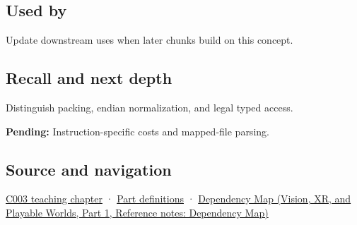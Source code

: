 \subsection{Used by}\label{appendix-0682dbfc5f0e-used-by}

\hypertarget{appendix-0682dbfc5f0e-used-by}{}

Update downstream uses when later chunks build on this concept.

\subsection{Recall and next depth}\label{appendix-0682dbfc5f0e-recall-and-next-depth}

\hypertarget{appendix-0682dbfc5f0e-recall-and-next-depth}{}

Distinguish packing, endian normalization, and legal typed access.

\textbf{Pending:} Instruction-specific costs and mapped-file parsing.

\subsection{Source and navigation}\label{appendix-0682dbfc5f0e-source-and-navigation}

\hypertarget{appendix-0682dbfc5f0e-source-and-navigation}{}

\hyperref[01-foundations-i-ch002-where-the-bytes-live]{C003 teaching chapter} · \hyperref[appendix-fd090d982a15-m003---parts-41-60]{Part definitions} · \href{../07-Vision-XR-and-Playable-Worlds-P01/main.pdf\#nameddest=appendix-4ad47bdd269a}{Dependency Map (Vision, XR, and Playable Worlds, Part 1, Reference notes: Dependency Map)}
